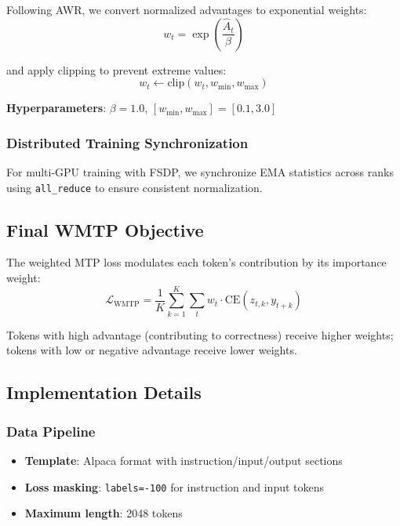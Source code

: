 Following AWR, we convert normalized advantages to exponential weights:
\begin{equation}
    w_t = \exp\left(\frac{\hat{A}_t}{\beta}\right)
    \label{eq:exp_weight}
\end{equation}

and apply clipping to prevent extreme values:
\begin{equation}
    w_t \leftarrow \text{clip}(w_t, w_{\min}, w_{\max})
    \label{eq:clipping}
\end{equation}

\textbf{Hyperparameters}: $\beta = 1.0$, $[w_{\min}, w_{\max}] = [0.1, 3.0]$

\subsubsection{Distributed Training Synchronization}

For multi-GPU training with FSDP, we synchronize EMA statistics across ranks using \texttt{all\_reduce} to ensure consistent normalization.

\subsection{Final WMTP Objective}

The weighted MTP loss modulates each token's contribution by its importance weight:
\begin{equation}
    \boxed{
    \mathcal{L}_{\text{WMTP}} = \frac{1}{K} \sum_{k=1}^{K} \sum_t w_t \cdot \text{CE}(z_{t,k}, y_{t+k})
    }
    \label{eq:wmtp}
\end{equation}

Tokens with high advantage (contributing to correctness) receive higher weights; tokens with low or negative advantage receive lower weights.

\subsection{Implementation Details}

\subsubsection{Data Pipeline}

\begin{itemize}[nosep]
    \item \textbf{Template}: Alpaca format with instruction/input/output sections
    \item \textbf{Loss masking}: \texttt{labels=-100} for instruction and input tokens
    \item \textbf{Maximum length}: 2048 tokens
\end{itemize}

